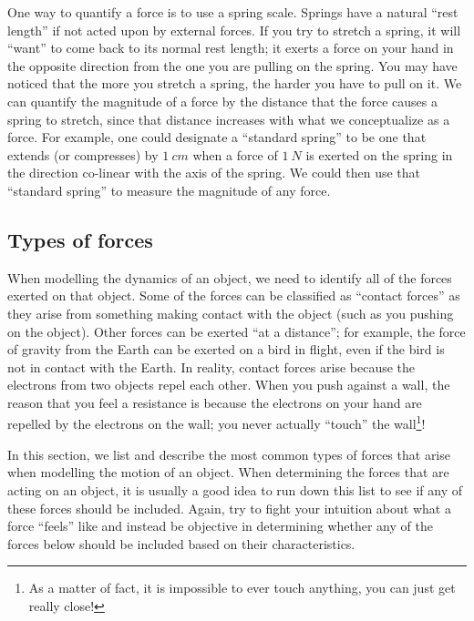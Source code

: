 One way to quantify a force is to use a spring scale. Springs have a natural ``rest length'' if not acted upon by external forces. If you try to stretch a spring, it will ``want'' to come back to its normal rest length; it exerts a force on your hand in the opposite direction from the one you are pulling on the spring. You may have noticed that the more you stretch a spring, the harder you have to pull on it. We can quantify the magnitude of a force by the distance that the force causes a spring to stretch, since that distance increases with what we conceptualize as a force. For example, one could designate a ``standard spring'' to be one that extends (or compresses) by $\SI{1}{cm}$ when a force of $\SI{1}{N}$ is exerted on the spring in the direction co-linear with the axis of the spring. We could then use that ``standard spring'' to measure the magnitude of any force.

\subsection{Types of forces}
\label{sec:newtonslaws:typesofforces}
When modelling the dynamics of an object, we need to identify all of the forces exerted on that object. Some of the forces can be classified as ``contact forces'' as they arise from something making contact with the object (such as you pushing on the object). Other forces can be exerted ``at a distance''; for example, the force of gravity from the Earth can be exerted on a bird in flight, even if the bird is not in contact with the Earth. In reality, contact forces arise because the electrons from two objects repel each other. When you push against a wall, the reason that you feel a resistance is because the electrons on your hand are repelled by the electrons on the wall; you never actually ``touch'' the wall\footnote{As a matter of fact, it is impossible to ever touch anything, you can just get really close!}!

In this section, we list and describe the most common types of forces that arise when modelling the motion of an object. When determining the forces that are acting on an object, it is usually a good idea to run down this list to see if any of these forces should be included. Again, try to fight your intuition about what a force ``feels'' like and instead be objective in determining whether any of the forces below should be included based on their characteristics.

